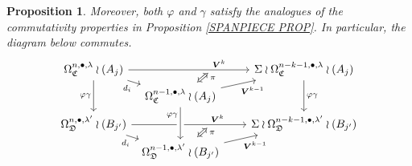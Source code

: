 \documentclass[a4paper,10pt
]{article}%
\numberwithin{equation}{section}
\numberwithin{figure}{section}
\newtheorem{proposition}[equation]{Proposition}%
\theoremstyle{definition} %
\newcommand{\1}{\ensuremath{\mathbbm 1}}%
\begin{document}
\begin{proposition}
	
	Moreover, both $\varphi$ and $\gamma$ satisfy the analogues of the commutativity properties in Proposition \ref{SPANPIECE PROP}.
	In particular, the diagram below commutes.
	\[
	\begin{tikzcd}[column sep = 5pt, row sep = 4pt]
	\Omega^{n,\bullet,\lambda}_{\mathfrak{C}} \wr (A_j)
	\ar{rrrrr}[name=toE2,near end]{\boldsymbol{V}^k} \ar{rd}[swap]{d_i} \ar{dd}[swap]{\varphi \gamma}
	&&&
	&&
	\Sigma \wr \Omega^{n-k-1,\bullet,\lambda}_{\mathfrak{C}} \wr (A_j) \ar{dd}{\varphi \gamma}
	\\
	&
	|[alias=DBE2]|
	\Omega^{n-1,\bullet,\lambda}_{\mathfrak{C}} \wr (A_j) \ar{rrrru}[swap]{\boldsymbol{V}^{k-1}}
	\\
	\Omega^{n,\bullet,\lambda'}_{\mathfrak{D}} \wr (B_{j'}) \ar{rrrrr}[name=toB2, near end]{\boldsymbol{V}^k} \ar{rd}[swap]{d_i}
	&&&
	&&
	\Sigma \wr \Omega^{n-k-1,\bullet,\lambda'}_{\mathfrak{D}} \wr (B_{j'})
	\\
	&
	|[alias=D2]| \Omega^{n-1,\bullet,\lambda'}_{\mathfrak{D}} \wr (B_{j'}) \ar{rrrru}[swap]{\boldsymbol{V}^{k-1}}
	\arrow[Leftrightarrow, from=DBE2, to=toE2, shorten <=0.1cm,shorten >=0.15cm
	,swap,near end,"\pi"
	]
	\arrow[Leftrightarrow, from=D2, to=toB2, shorten <=0.1cm,shorten >=0.15cm,swap,near end,"\pi"]
	\arrow[from=DBE2, to=D2, crossing over, near start, swap, "\varphi \gamma"]
	\end{tikzcd}
	\]

\end{proposition}
\end{document}
